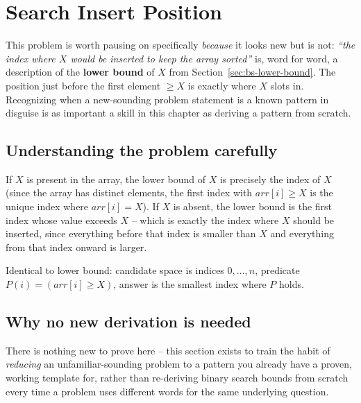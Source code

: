 \section{Search Insert Position}
\label{sec:bs-search-insert}


\begin{patternbox}
This problem is worth pausing on specifically \emph{because} it looks new
but is not: \emph{``the index where $X$ would be inserted to keep the array
sorted''} is, word for word, a description of the \textbf{lower bound} of
$X$ from Section~\ref{sec:bs-lower-bound}. The position just before the
first element $\ge X$ is exactly where $X$ slots in. Recognizing when a
new-sounding problem statement is a known pattern in disguise is as
important a skill in this chapter as deriving a pattern from scratch.
\end{patternbox}

\subsection*{Understanding the problem carefully}

If $X$ is present in the array, the lower bound of $X$ is precisely the
index of $X$ (since the array has distinct elements, the first index with
$\textit{arr}[i] \ge X$ is the unique index where $\textit{arr}[i] = X$).
If $X$ is absent, the lower bound is the first index whose value exceeds
$X$ -- which is exactly the index where $X$ should be inserted, since
everything before that index is smaller than $X$ and everything from that
index onward is larger.

\begin{ideabox}
Identical to lower bound: candidate space is indices $0, \dots, n$,
predicate $P(i) = (\textit{arr}[i] \ge X)$, answer is the smallest index
where $P$ holds.
\end{ideabox}

\subsection*{Why no new derivation is needed}

There is nothing new to prove here -- this section exists to train the
habit of \emph{reducing} an unfamiliar-sounding problem to a pattern you
already have a proven, working template for, rather than re-deriving binary
search bounds from scratch every time a problem uses different words for
the same underlying question.

